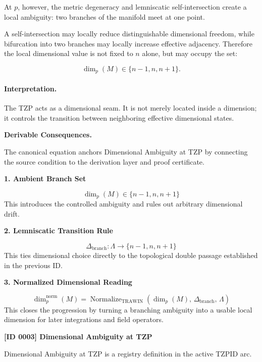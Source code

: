 At $p$, however, the metric degeneracy and lemniscatic self-intersection create a local ambiguity: two branches of the manifold meet at one point.

A self-intersection may locally reduce distinguishable dimensional freedom, while bifurcation into two branches may locally increase effective adjacency. Therefore the local dimensional value is not fixed to $n$ alone, but may occupy the set:

\begin{equation}
\dim_p(M)\in\{n-1,n,n+1\}.
\end{equation}

\paragraph{Interpretation.}
The TZP acts as a dimensional seam. It is not merely located inside a dimension; it controls the transition between neighboring effective dimensional states.

\par\vspace{0.35em}
\noindent\textbf{Derivable Consequences.}\quad
\begingroup
\footnotesize
\raggedright
The canonical equation anchors Dimensional Ambiguity at TZP by connecting the source condition to the derivation layer and proof certificate.
\par\endgroup

\noindent\textbf{1. Ambient Branch Set}\par
\[
\dim_{p}(M) \in \{n-1,n,n+1\}
\]
\noindent This introduces the controlled ambiguity and rules out arbitrary dimensional drift.\par
\noindent\textbf{2. Lemniscatic Transition Rule}\par
\[
\Delta_{\mathrm{branch}} :
\Lambda \longrightarrow \{n-1,n,n+1\}
\]
\noindent This ties dimensional choice directly to the topological double passage established in the previous ID.\par
\noindent\textbf{3. Normalized Dimensional Reading}\par
\[
\dim_{p}^{\mathrm{norm}}(M)
=
\operatorname{Normalize}_{\mathrm{TRAWIN}}
\!\left(
\dim_{p}(M),\,
\Delta_{\mathrm{branch}},\,
\Lambda
\right)
\]
\noindent This closes the progression by turning a branching ambiguity into a usable local dimension for later integrations and field operators.\par

\clearpage
\noindent\textbf{[ID 0003] Dimensional Ambiguity at TZP}\par
\vspace{0.35em}
\begingroup\small
{}
Dimensional Ambiguity at TZP is a registry definition in the active TZPID arc.

